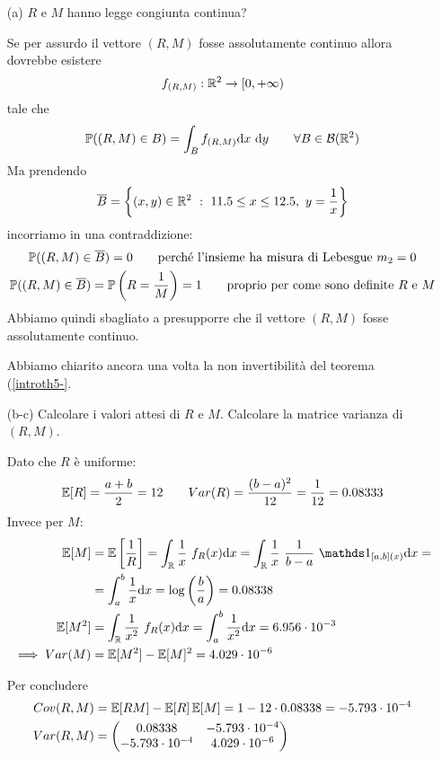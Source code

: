 \begin{enumerate}
\item [(a)] $R$ e $M$ hanno legge congiunta continua?

Se per assurdo il vettore $(R,M)$ fosse assolutamente continuo allora dovrebbe esistere
\[
f_{(R,M)}:\mathbb{R}^2\to[0,+\infty)
\]
tale che
\[
\mathbb{P}((R,M)\in B)=\int_B f_{(R,M)}\mathrm{d} x\ \mathrm{d} y\qquad\forall B\in\mathcal{B}(\mathbb{R}^2)
\]
Ma prendendo
\[
\overline{B}=\left\{(x,y)\in\mathbb{R}^2\ :\ 11.5\leq x\leq 12.5,\ y=\frac{1}{x}  \right\}
\]
incorriamo in una contraddizione:
\begin{gather*} 
\mathbb{P}((R,M)\in \overline{B})=0\qquad\text{perché l'insieme ha misura di Lebesgue }m_2=0 \\
\mathbb{P}((R,M)\in \overline{B})=\mathbb{P}\left(R=\frac{1}{M}\right)=1\qquad\text{proprio per come sono definite }R\text{ e }M
\end{gather*}
Abbiamo quindi sbagliato a presupporre che il vettore $(R,M)$ fosse assolutamente continuo.

\begin{oss} Abbiamo chiarito ancora una volta la non invertibilità del teorema (\ref{introth5-}. \end{oss}

\item [(b-c)] Calcolare i valori attesi di $R$ e $M$. Calcolare la matrice varianza di $(R,M)$.

Dato che $R$ è uniforme:
\[
\mathbb{E}[R]=\frac{a+b}{2}=12 \qquad Var(R)=\frac{(b-a)^2}{12}=\frac{1}{12}=0.08333
\]
Invece per $M$:
\begin{gather*}
\begin{aligned}
\EE[M]&=\EE\left[ \frac{1}{R} \right]=\int_\RR \frac{1}{x}\ f_R(x)\dx=\int_\RR \frac{1}{x}\ \frac{1}{b-a}\ \Ind_{[a,b](x)}\dx=\\
&=\inta \frac{1}{x}\dx=\log\left( \frac{b}{a} \right)=0.08338\\
\EE[M^2]&=\int_\RR \frac{1}{x^2}\ f_R(x)\dx=\inta \frac{1}{x^2}\dx=6.956\cdot 10^{-3}\\
\implies Var(M)&=\EE[M^2]-\EE[M]^2=4.029\cdot 10^{-6}
\end{aligned}
\end{gather*}

Per concludere
\begin{gather*}
\begin{aligned}
Cov(R,M)&=\mathbb{E}[RM]-\mathbb{E}[R]\,\mathbb{E}[M]=1-12\cdot 0.08338 = -5.793\cdot 10^{-4}\\
Var(R,M)&=
\begin{pmatrix}
0.08338 & -5.793\cdot 10^{-4} \\
-5.793\cdot 10^{-4} & 4.029\cdot 10^{-6} \\
\end{pmatrix}
\end{aligned}
\end{gather*}


\end{enumerate}
